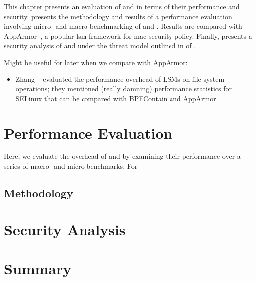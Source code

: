 This chapter presents an evaluation of \bpfbox{} and \bpfcontain{} in terms of their
performance and security.  presents the methodology and results
of a performance evaluation involving micro- and macro-benchmarking of \bpfbox{} and
\bpfcontain{}. Results are compared with AppArmor~\cite{cowan2000_apparmor}, a popular
\gls{lsm} framework for \gls{mac} security policy. Finally, 
presents a security analysis of \bpfbox{} and \bpfcontain{} under the threat model
outlined in  of .

\begin{inprogress}
  Might be useful for later when we compare with AppArmor:
  \begin{itemize}
    \item Zhang \etal~\cite{zhang2021_lsm_file_overhead} evaluated the performance
    overhead of LSMs on file system operations; they mentioned (really damning) performance
    statistics for SELinux that can be compared with BPFContain and AppArmor
  \end{itemize}
\end{inprogress}

\section{Performance Evaluation}%
\label{s:eval-performance}

\begin{inprogress}
Here, we evaluate the overhead of \bpfbox{} and \bpfcontain{} by examining their performance
over a series of macro- and micro-benchmarks. For
\end{inprogress}

\subsection{Methodology}%
\label{ss:performance-methodology}



\section{Security Analysis}%
\label{s:eval-security}



\section{Summary}%
\label{s:eval-summary}
